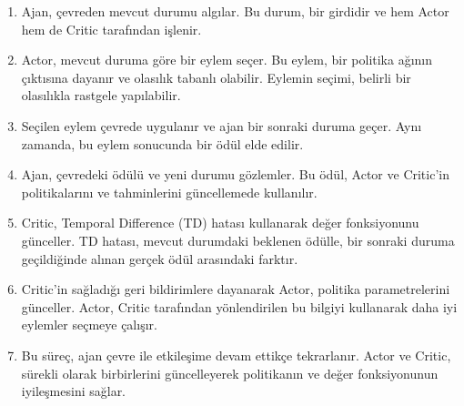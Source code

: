 \begin{enumerate}
    \item Ajan, çevreden mevcut durumu algılar. Bu durum, bir girdidir ve hem Actor hem de Critic tarafından işlenir.
    \item Actor, mevcut duruma göre bir eylem seçer. Bu eylem, bir politika ağının çıktısına dayanır ve olasılık tabanlı olabilir. Eylemin seçimi, belirli bir olasılıkla rastgele yapılabilir.
    \item Seçilen eylem çevrede uygulanır ve ajan bir sonraki duruma geçer. Aynı zamanda, bu eylem sonucunda bir ödül elde edilir.
    \item Ajan, çevredeki ödülü ve yeni durumu gözlemler. Bu ödül, Actor ve Critic’in politikalarını ve tahminlerini güncellemede kullanılır.
    \item Critic, Temporal Difference (TD) hatası kullanarak değer fonksiyonunu günceller. TD hatası, mevcut durumdaki beklenen ödülle, bir sonraki duruma geçildiğinde alınan gerçek ödül arasındaki farktır.
    \item Critic'in sağladığı geri bildirimlere dayanarak Actor, politika parametrelerini günceller. Actor, Critic tarafından yönlendirilen bu bilgiyi kullanarak daha iyi eylemler seçmeye çalışır.
    \item Bu süreç, ajan çevre ile etkileşime devam ettikçe tekrarlanır. Actor ve Critic, sürekli olarak birbirlerini güncelleyerek politikanın ve değer fonksiyonunun iyileşmesini sağlar.
\end{enumerate}

\newpage
